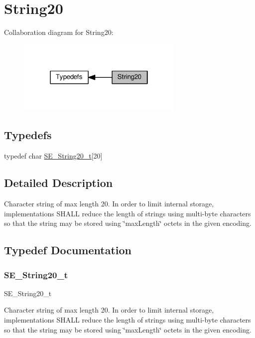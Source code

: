 \hypertarget{group__String20}{}\section{String20}
\label{group__String20}
Collaboration diagram for String20\+:\nopagebreak
\begin{figure}[H]
\begin{center}
\leavevmode
\includegraphics[width=226pt]{group__String20}
\end{center}
\end{figure}
\subsection*{Typedefs}
\begin{DoxyCompactItemize}
\item 
typedef char \hyperlink{group__String20_gac62354528eb48096f8deab6e503a3193}{S\+E\+\_\+\+String20\+\_\+t}\mbox{[}20\mbox{]}
\end{DoxyCompactItemize}


\subsection{Detailed Description}
Character string of max length 20. In order to limit internal storage, implementations S\+H\+A\+LL reduce the length of strings using multi-\/byte characters so that the string may be stored using \char`\"{}max\+Length\char`\"{} octets in the given encoding. 

\subsection{Typedef Documentation}
\mbox{\label{group__String20_gac62354528eb48096f8deab6e503a3193}} 
\subsubsection{\texorpdfstring{S\+E\+\_\+\+String20\+\_\+t}{SE\_String20\_t}}
{\footnotesize\ttfamily S\+E\+\_\+\+String20\+\_\+t}

Character string of max length 20. In order to limit internal storage, implementations S\+H\+A\+LL reduce the length of strings using multi-\/byte characters so that the string may be stored using \char`\"{}max\+Length\char`\"{} octets in the given encoding. 